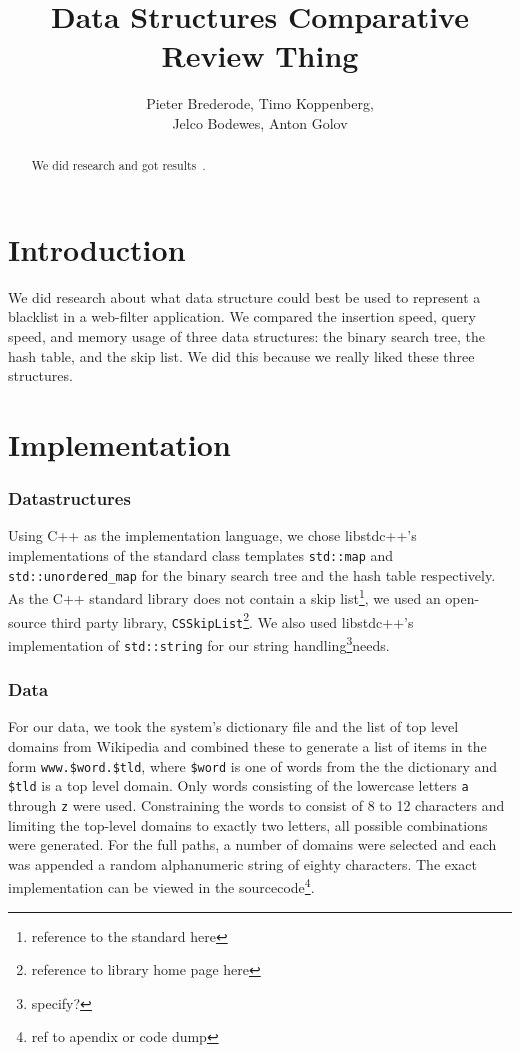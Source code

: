 \documentclass[12pt,a4paper]{article}
\title{Data Structures Comparative Review Thing}
\author{Pieter Brederode, Timo Koppenberg, \\ Jelco Bodewes, Anton Golov}
\begin{document}
    \maketitle

    \begin{abstract}
        We did research and got results~\cite{CallOfCthulhu}.
    \end{abstract}


    \section{Introduction}

    We did research about what data structure could best be used to represent a blacklist in a 
    web-filter application.  We compared the insertion speed, query speed, and memory usage of three
    data structures: the binary search tree, the hash table, and the skip list.  We did this because
    we really liked these three structures. 

    \section{Implementation}
    \subsubsection*{Datastructures}

    Using C++ as the implementation language, we chose libstdc++'s implementations of the standard class
    templates \texttt{std::map} and \texttt{std::unordered\_map} for the binary search
    tree and the hash table respectively.  As the C++ standard library does not contain a skip
    list\footnote{reference to the standard here}, we used an open-source third party library,
    \texttt{CSSkipList}\footnote{reference to library home page here}.  We also used libstdc++'s
    implementation of \texttt{std::string} for our string handling\footnote{specify?}needs.
    
    \subsubsection*{Data}
    For our data, we took the system's dictionary file and the list of top level domains from Wikipedia
    and combined these to generate a list of items in the form \texttt{www.\$word.\$tld}, where
    \texttt{\$word} is one of words from the the dictionary and \texttt{\$tld} is a top level domain.  Only
    words consisting of the lowercase letters \texttt{a} through \texttt{z} were used.  Constraining the
    words to consist of 8 to 12 characters and limiting the top-level domains to exactly two letters, 
    all possible combinations were generated.  For the full paths, a number of domains were selected
    and each was appended a random alphanumeric string of eighty characters.  The exact implementation
    can be viewed in the sourcecode\footnote{ref to apendix or code dump}.
\end{document}
